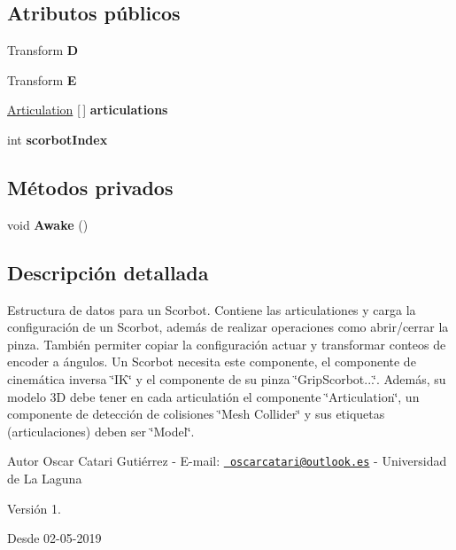 \subsection*{Atributos públicos}
\begin{DoxyCompactItemize}
\item 
\mbox{\label{class_scorbot_model_a289b612c7d1813ad345f42432e7ba283}} 
Transform {\bfseries D}
\item 
\mbox{\label{class_scorbot_model_a2ba60afbee406ae079a8680b1836913b}} 
Transform {\bfseries E}
\item 
\mbox{\label{class_scorbot_model_a2c5605692707695fc2e4a260c5fbde03}} 
\mbox{\hyperlink{class_articulation}{Articulation}} \mbox{[}$\,$\mbox{]} {\bfseries articulations}
\item 
\mbox{\label{class_scorbot_model_af6bce49ef384fc8b753e7291ca682100}} 
int {\bfseries scorbot\+Index}
\end{DoxyCompactItemize}
\subsection*{Métodos privados}
\begin{DoxyCompactItemize}
\item 
\mbox{\label{class_scorbot_model_a8fe778901e324215e758a649ed963caa}} 
void {\bfseries Awake} ()
\end{DoxyCompactItemize}


\subsection{Descripción detallada}
Estructura de datos para un Scorbot. Contiene las articulationes y carga la configuración de un Scorbot, además de realizar operaciones como abrir/cerrar la pinza. También permiter copiar la configuración actuar y transformar conteos de encoder a ángulos. Un Scorbot necesita este componente, el componente de cinemática inversa \char`\"{}\+I\+K\char`\"{} y el componente de su pinza \char`\"{}\+Grip\+Scorbot...\char`\"{}. Además, su modelo 3D debe tener en cada articulatión el componente \char`\"{}\+Articulation\char`\"{}, un componente de detección de colisiones \char`\"{}\+Mesh Collider\char`\"{} y sus etiquetas (articulaciones) deben ser \char`\"{}\+Model\char`\"{}. \begin{DoxyAuthor}{Autor}
Oscar Catari Gutiérrez -\/ E-\/mail\+: \href{mailto:oscarcatari@outlook.es}{\texttt{ oscarcatari@outlook.\+es}} -\/ Universidad de La Laguna 
\end{DoxyAuthor}
\begin{DoxyVersion}{Versión}
1. 
\end{DoxyVersion}
\begin{DoxySince}{Desde}
02-\/05-\/2019 
\end{DoxySince}


